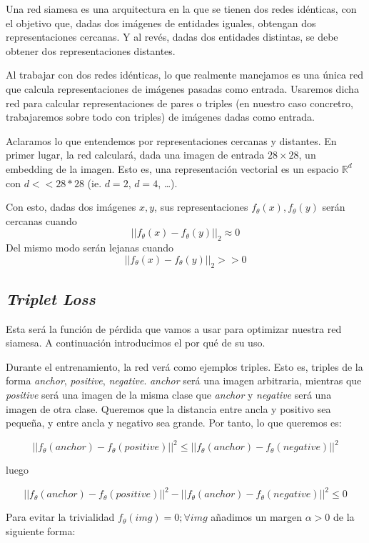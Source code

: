 \documentclass[11pt]{article}
\begin{document}
Una red siamesa es una arquitectura en la que se tienen dos redes idénticas, con el objetivo que, dadas dos imágenes de entidades iguales, obtengan dos representaciones cercanas. Y al revés, dadas dos entidades distintas, se debe obtener dos representaciones distantes.

Al trabajar con dos redes idénticas, lo que realmente manejamos es una única red que calcula representaciones de imágenes pasadas como entrada. Usaremos dicha red para calcular representaciones de pares o triples (en nuestro caso concretro, trabajaremos sobre todo con triples) de imágenes dadas como entrada.

Aclaramos lo que entendemos por representaciones cercanas y distantes. En primer lugar, la red calculará, dada una imagen de entrada $28\times28$, un embedding de la imagen. Esto es, una representación vectorial es un espacio $\mathbb{R}^d$ con $d << 28*28$ (ie. $d = 2$, $d = 4$, \ldots). 

Con esto, dadas dos imágenes $x, y$, sus representaciones $ f_{\theta}(x),  f_{\theta}(y)$ serán cercanas cuando $$|| f_{\theta}(x) - f_{\theta}(y)||_2 \approx 0$$ Del mismo modo serán lejanas cuando $$|| f_{\theta}(x) - f_{\theta}(y)||_2 >> 0$$ 

\subsection{\emph{Triplet Loss}}

Esta será la función de pérdida que vamos a usar para optimizar nuestra red siamesa. A continuación introducimos el por qué de su uso.

Durante el entrenamiento, la red verá como ejemplos triples. Esto es, triples de la forma \emph{anchor}, \emph{positive}, \emph{negative}. \emph{anchor} será una imagen arbitraria, mientras que \emph{positive} será una imagen de la misma clase que \emph{anchor} y \emph{negative} será una imagen de otra clase. Queremos que la distancia entre ancla y positivo sea pequeña, y entre ancla y negativo sea grande. Por tanto, lo que queremos es:

$$||f_{\theta}(anchor) - f_{\theta}(positive)||^2 \leq ||f_{\theta}(anchor) - f_{\theta}(negative)||^2 $$

luego 

$$||f_{\theta}(anchor) - f_{\theta}(positive)||^2 - ||f_{\theta}(anchor) - f_{\theta}(negative)||^2 \leq 0$$

Para evitar la trivialidad $f_{\theta}(img) = 0; \forall img$ añadimos un margen $\alpha > 0$ de la siguiente forma:
\end{document}
